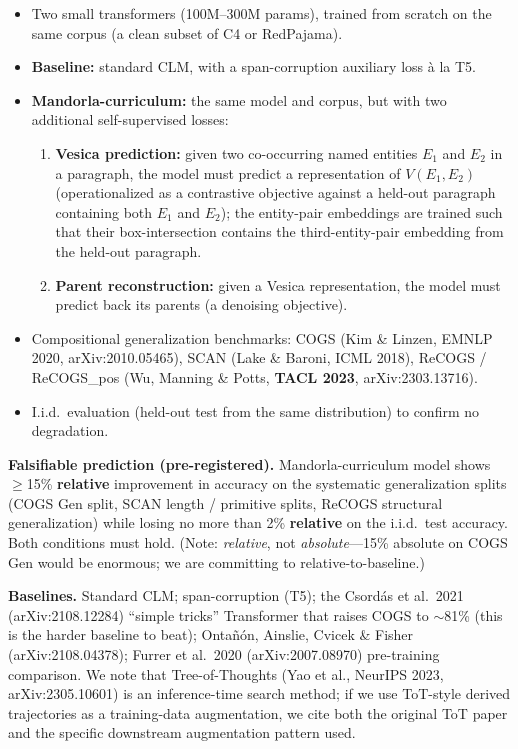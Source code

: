 \documentclass[11pt,a4paper]{article}
\begin{document}
\begin{itemize}[leftmargin=*]
  \item Two small transformers (100M--300M params), trained from scratch on the same corpus (a clean subset of C4 or RedPajama).
  \item \textbf{Baseline:} standard CLM, with a span-corruption auxiliary loss \`a la T5.
  \item \textbf{Mandorla-curriculum:} the same model and corpus, but with two additional self-supervised losses:
  \begin{enumerate}
    \item \textbf{Vesica prediction:} given two co-occurring named entities $E_1$ and $E_2$ in a paragraph, the model must predict a representation of $V(E_1, E_2)$ (operationalized as a contrastive objective against a held-out paragraph containing both $E_1$ and $E_2$); the entity-pair embeddings are trained such that their box-intersection contains the third-entity-pair embedding from the held-out paragraph.
    \item \textbf{Parent reconstruction:} given a Vesica representation, the model must predict back its parents (a denoising objective).
  \end{enumerate}
  \item Compositional generalization benchmarks: COGS (Kim \& Linzen, EMNLP 2020, arXiv:2010.05465), SCAN (Lake \& Baroni, ICML 2018), ReCOGS / ReCOGS\_pos (Wu, Manning \& Potts, \textbf{TACL 2023}, arXiv:2303.13716).
  \item I.i.d.\ evaluation (held-out test from the same distribution) to confirm no degradation.
\end{itemize}

\textbf{Falsifiable prediction (pre-registered).} Mandorla-curriculum model shows $\geq$15\% \textbf{relative} improvement in accuracy on the systematic generalization splits (COGS Gen split, SCAN length / primitive splits, ReCOGS structural generalization) while losing no more than 2\% \textbf{relative} on the i.i.d.\ test accuracy. Both conditions must hold. (Note: \emph{relative}, not \emph{absolute}---15\% absolute on COGS Gen would be enormous; we are committing to relative-to-baseline.)

\textbf{Baselines.} Standard CLM; span-corruption (T5); the Csord\'as et al.\ 2021 (arXiv:2108.12284) ``simple tricks'' Transformer that raises COGS to $\sim$81\% (this is the harder baseline to beat); Onta\~n\'on, Ainslie, Cvicek \& Fisher (arXiv:2108.04378); Furrer et al.\ 2020 (arXiv:2007.08970) pre-training comparison. We note that Tree-of-Thoughts (Yao et al., NeurIPS 2023, arXiv:2305.10601) is an inference-time search method; if we use ToT-style derived trajectories as a training-data augmentation, we cite both the original ToT paper and the specific downstream augmentation pattern used.
\end{document}

